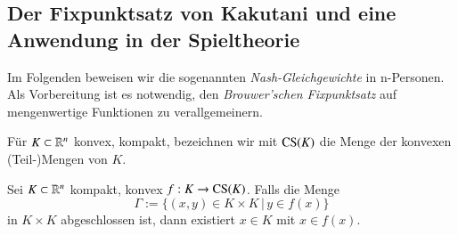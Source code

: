 \subsection{Der Fixpunktsatz von Kakutani und eine Anwendung in der Spieltheorie}

Im Folgenden beweisen wir die sogenannten \textit{Nash-Gleichgewichte} in n-Personen.
Als Vorbereitung ist es notwendig, den \textit{Brouwer'schen Fixpunktsatz} auf mengenwertige Funktionen
zu verallgemeinern.

Für $K\subset \mathbb{R}^n$ konvex, kompakt, bezeichnen wir mit $\mathrm{CS}(K)$ die Menge der konvexen (Teil-)Mengen
von $K$.

\begin{theorem}[Kakutani]\label{2.16}
    Sei $K\subset \mathbb{R}^n$ kompakt, konvex $f:K\rightarrow \mathrm{CS}(K)$. Falls die Menge
    \[
        \Gamma := \{(x,y)\in K\times K\, |\, y\in f(x)\}
    \]
    in $K\times K$ abgeschlossen ist, dann existiert $x\in K$ mit $x\in f(x)$.
\end{theorem}

